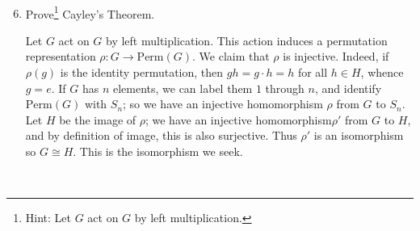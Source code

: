 \documentclass[12pt]{amsart}
\newcommand{\Bold}[1]{\contour{black}{#1}}
\newcommand{\solution}[1]{\ifthenelse {\equal{\displaysol}{1}} {\begin{framed}{\color{meretale}\noindent #1}\end{framed}} { \ }}
\newcommand\itemA{\stepcounter{enumi}\item[{\Bold{(\theenumi)}}]}
\begin{document}
\

\begin{enumerate}
\setcounter{enumi}{5}

\itemA Prove\footnote{Hint: Let $G$ act on $G$ by left multiplication.} Cayley's Theorem.
\solution{Let $G$ act on $G$ by left multiplication. This action induces a permutation representation $\rho: G\to \mathrm{Perm}(G)$. We claim that $\rho$ is injective. Indeed, if $\rho(g)$ is the identity permutation, then $gh = g \cdot h = h$ for all $h\in H$, whence $g=e$. If $G$ has $n$ elements, we can label them $1$ through $n$, and identify $\mathrm{Perm}(G)$ with $S_n$; so we have an injective homomorphism $\rho$ from $G$ to $S_n$. Let $H$ be the image of $\rho$; we have an injective homomorphism$\rho'$  from $G$ to $H$, and by definition of image, this is also surjective. Thus $\rho'$ is an isomorphism so $G\cong H$. This is the isomorphism we seek.}

\end{enumerate}
\end{document}
